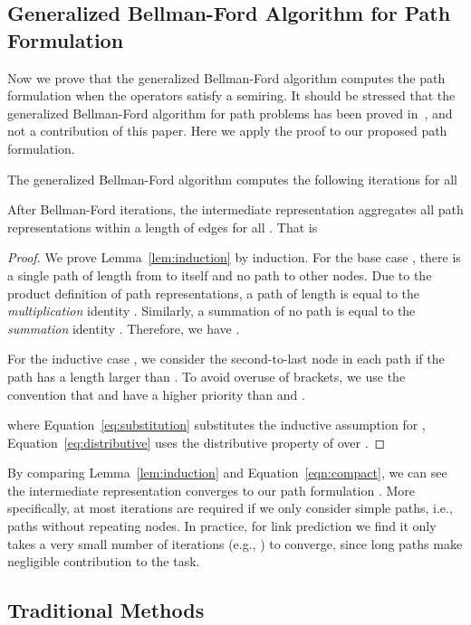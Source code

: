\subsection{Generalized Bellman-Ford Algorithm for Path Formulation}
Now we prove that the generalized Bellman-Ford algorithm computes the path formulation when the operators  satisfy a semiring. It should be stressed that the generalized Bellman-Ford algorithm for path problems has been proved in~\cite{baras2010path}, and not a contribution of this paper. Here we apply the proof to our proposed path formulation.

The generalized Bellman-Ford algorithm computes the following iterations for all 

\begin{lemma}\label{lem:induction}
After  Bellman-Ford iterations, the intermediate representation  aggregates all path representations within a length of  edges for all . That is

\end{lemma}
\begin{proof}
We prove Lemma~\ref{lem:induction} by induction. For the base case , there is a single path of length  from  to itself and no path to other nodes. Due to the product definition of path representations, a path of length  is equal to the \emph{multiplication} identity . Similarly, a summation of no path is equal to the \emph{summation} identity . Therefore, we have .

For the inductive case , we consider the second-to-last node  in each path if the path has a length larger than . To avoid overuse of brackets, we use the convention that  and  have a higher priority than  and . 

where Equation~\ref{eq:substitution} substitutes the inductive assumption for , Equation~\ref{eq:distributive} uses the distributive property of  over .
\end{proof}

By comparing Lemma~\ref{lem:induction} and Equation~\ref{eqn:compact}, we can see the intermediate representation converges to our path formulation . More specifically, at most  iterations are required if we only consider simple paths, i.e., paths without repeating nodes. In practice, for link prediction we find it only takes a very small number of iterations (e.g., ) to converge, since long paths make negligible contribution to the task.

\subsection{Traditional Methods}


